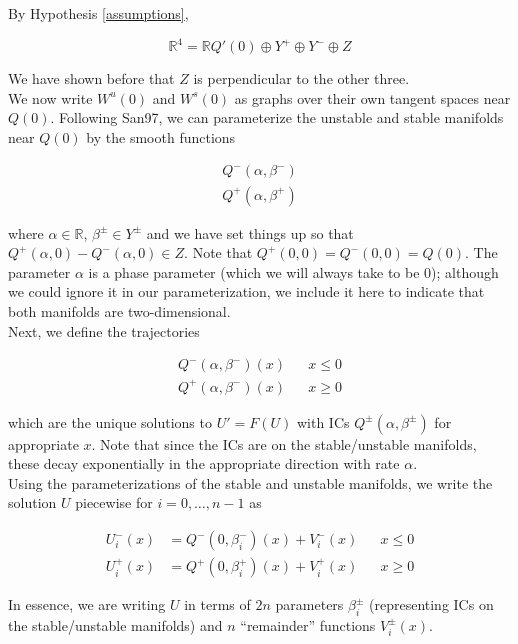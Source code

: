 \documentclass[12pt]{article}
\def\R{{\mathbb R}}
\begin{document}
By Hypothesis \ref{assumptions},

\[
\R^4 = \R Q'(0) \oplus Y^+ \oplus Y^- \oplus Z
\]
 
We have shown before that $Z$ is perpendicular to the other three. \\

We now write $W^u(0)$ and $W^s(0)$ as graphs over their own tangent spaces near $Q(0)$. Following San97, we can parameterize the unstable and stable manifolds near $Q(0)$ by the smooth functions

\begin{align*}
Q^-(\alpha, \beta^-) \\
Q^+(\alpha, \beta^+)
\end{align*}

where $\alpha \in \R$, $\beta^\pm \in Y^\pm$ and we have set things up so that $Q^+(\alpha, 0) - Q^-(\alpha, 0) \in Z$. Note that $Q^+(0, 0) = Q^-(0, 0) = Q(0)$. The parameter $\alpha$ is a phase parameter (which we will always take to be 0); although we could ignore it in our parameterization, we include it here to indicate that both manifolds are two-dimensional. \\

Next, we define the trajectories

\begin{align*}
Q^-(\alpha, \beta^-)(x) && x \leq 0 \\
Q^+(\alpha, \beta^-)(x) && x \geq 0
\end{align*}

which are the unique solutions to $U' = F(U)$ with ICs $Q^\pm(\alpha, \beta^\pm)$ for appropriate $x$. Note that since the ICs are on the stable/unstable manifolds, these decay exponentially in the appropriate direction with rate $\alpha$.\\

Using the parameterizations of the stable and unstable manifolds, we write the solution $U$ piecewise for $i = 0, \dots, n-1$ as

\begin{align*}
U_i^-(x) &= Q^-(0, \beta_i^-)(x) + V_i^-(x) && x \leq 0 \\
U_i^+(x) &= Q^+(0, \beta_i^+)(x) + V_i^+(x) && x \geq 0
\end{align*}

In essence, we are writing $U$ in terms of $2n$ parameters $\beta_i^\pm$ (representing ICs on the stable/unstable manifolds) and $n$ ``remainder'' functions $V_i^\pm(x)$.\\
\end{document}
